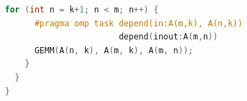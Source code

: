 \documentclass[xcolor={usenames,dvipsnames,svgnames,table}, aspectratio=43]{beamer}
\begin{document}
\begin{frame}[fragile]
\begin{minipage}[t]{0.52\linewidth}
\begin{onlyenv}
\begin{lstlisting}[language=c]
    for (int n = k+1; n < m; n++) {
      #pragma omp task depend(in:A(m,k), A(n,k))
                       depend(inout:A(m,n))
      GEMM(A(n, k), A(m, k), A(m, n));
    }
  }
}
  \end{lstlisting}
\end{onlyenv}
\end{minipage}
\begin{minipage}[t]{0.46\linewidth}
  \vspace{-0.3cm}
\begin{figure}
\end{figure}
\end{minipage}
\end{frame}
\end{document}
